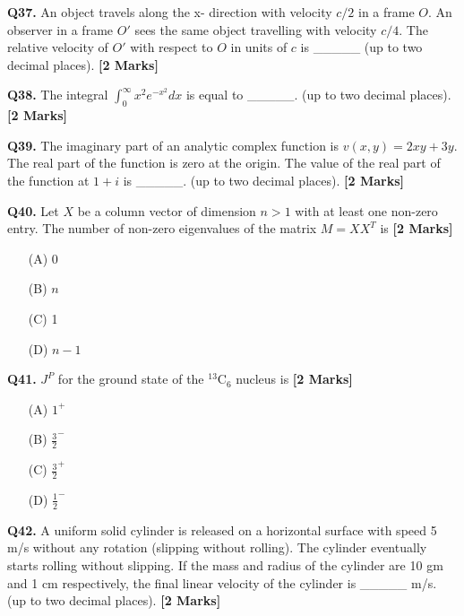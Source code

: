 \documentclass[11pt]{article}
\newcommand{\questionb}[2]{
    \noindent\textbf{Q#2.} #1 \hfill \textbf{[2 Marks]}
}
\begin{document}
\questionb{An object travels along the x- direction with velocity \( c/2 \) in a frame \( O \). An observer in a frame \( O' \) sees the same object travelling with velocity \( c/4 \). The relative velocity of \( O' \) with respect to \( O \) in units of \( c \) is \_\_\_\_\_ (up to two decimal places).}{37}
\vspace{0.5cm}

\questionb{The integral \(\int_{0}^{\infty} x^2 e^{-x^2} dx\) is equal to \_\_\_\_\_. (up to two decimal places).}{38}
\vspace{0.5cm}

\questionb{The imaginary part of an analytic complex function is \(v(x, y) = 2xy + 3y\). The real part of the function is zero at the origin. The value of the real part of the function at \(1 + i\) is \_\_\_\_\_. (up to two decimal places).}{39}
\vspace{0.5cm}

\questionb{Let \(X\) be a column vector of dimension \(n > 1\) with at least one non-zero entry. The number of non-zero eigenvalues of the matrix \(M = XX^T\) is}{40}
\begin{enumerate}
    \item[(A)] 0
    \item[(B)] \(n\)
    \item[(C)] 1
    \item[(D)] \(n - 1\)
\end{enumerate}
\vspace{0.5cm}

\questionb{\(J^P\) for the ground state of the \(^{13}\text{C}_6\) nucleus is}{41}
\begin{enumerate}
    \item[(A)] \(1^+\)
    \item[(B)] \(\frac{3}{2}^{-}\)
    \item[(C)] \(\frac{3}{2}^+\)
    \item[(D)] \(\frac{1}{2}^{-}\)
\end{enumerate}
\vspace{0.5cm}

\questionb{A uniform solid cylinder is released on a horizontal surface with speed 5 m/s without any rotation (slipping without rolling). The cylinder eventually starts rolling without slipping. If the mass and radius of the cylinder are 10 gm and 1 cm respectively, the final linear velocity of the cylinder is \_\_\_\_\_ m/s. (up to two decimal places).}{42}
\vspace{0.5cm}
\end{document}
